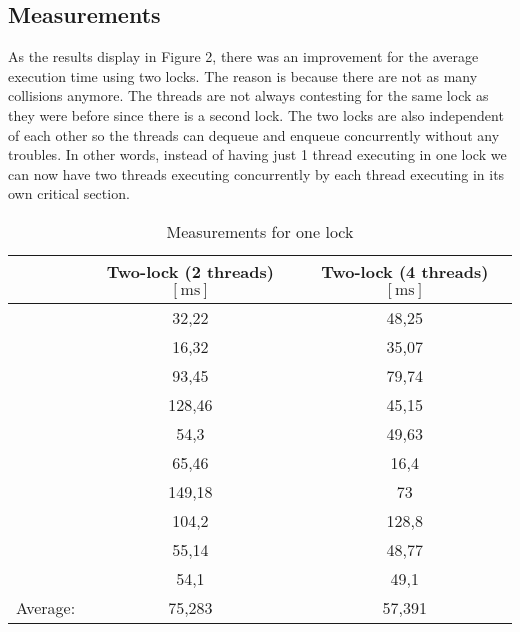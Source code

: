 \documentclass[a4paper,11pt,twoside,fleqn]{article}
\begin{document}
\subsection{Measurements}

As the results display in Figure 2, there was an improvement for the average execution time using two locks. The reason is because there are not as many collisions anymore. The threads are not always contesting for the same lock as they were before since there is a second lock. The two locks are also independent of each other so the threads can dequeue and enqueue concurrently without any troubles. In other words, instead of having just 1 thread executing in one lock we can now have two threads executing concurrently by each thread executing in its own critical section.

\begin {table}[H]
\caption {Measurements for one lock}\label{tab:title} 
\begin{center}
\begin{tabulary}{0.7\linewidth}{sSS}
\toprule
        & \textnormal{Two-lock (2 threads)}$[\si{\milli\second}]$ & \textnormal{Two-lock (4 threads)}$[\si{\milli\second}]$ \\
\midrule
                      & 32,22                 & 48,25  \\
                      & 16,32                 & 35,07  \\
                      & 93,45                 & 79,74  \\
                      & 128,46                & 45,15  \\
                      & 54,3                  & 49,63  \\
                      & 65,46                 & 16,4   \\
                      & 149,18                & 73     \\
                      & 104,2                 & 128,8  \\
                      & 55,14                 & 48,77  \\
                      & 54,1                  & 49,1   \\
\midrule
Average:        & 75,283                & 57,391 \\
\bottomrule
\end{tabulary}
\end{center}
\end {table}
\end{document}
